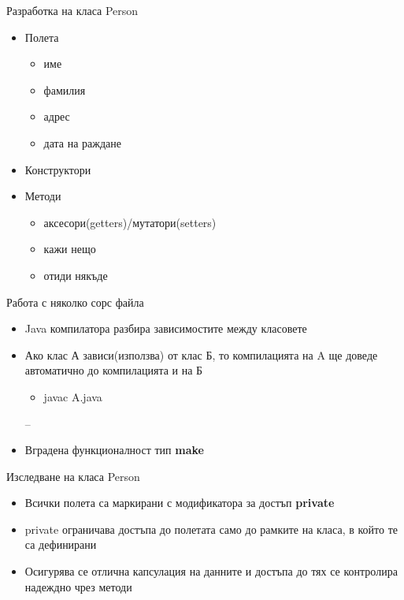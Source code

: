 \documentclass{beamer}
\begin{document}
\begin{frame}{Разработка на класа Person}
  \transdissolve
  \begin{itemize}
  \item Полета \pause
    \begin{itemize}
    \item име \pause
    \item фамилия \pause
    \item адрес \pause
    \item дата на раждане \pause
    \end{itemize}
  \item Конструктори \pause
  \item Методи \pause
    \begin{itemize}
    \item аксесори(getters)/мутатори(setters) \pause
    \item кажи нещо \pause
    \item отиди някъде
    \end{itemize}
  \end{itemize}
\end{frame}

\begin{frame}{Работа с няколко сорс файла}
  \transdissolve
  \begin{itemize}
  \item Java компилатора разбира
    зависимостите между класовете \pause
  \item Ако клас А зависи(използва) от клас Б, то компилацията на A ще
    доведе автоматично до компилацията и на Б \pause
    \begin{itemize}
    \item javac A.java \pause
    \end{itemize}
–  \item Вградена функционалност тип \textbf{make}
  \end{itemize}
\end{frame}

\begin{frame}{Изследване на класа Person}
  \transdissolve
  \begin{itemize}
  \item Всички полета са маркирани с
    модификатора за достъп \textbf{private} \pause
  \item private ограничава достъпа до полетата
    само до рамките на класа, в който те са
    дефинирани \pause
  \item Осигурява се отлична капсулация на
    данните и достъпа до тях се контролира
    надеждно чрез методи
  \end{itemize}
\end{frame}
\end{document}

